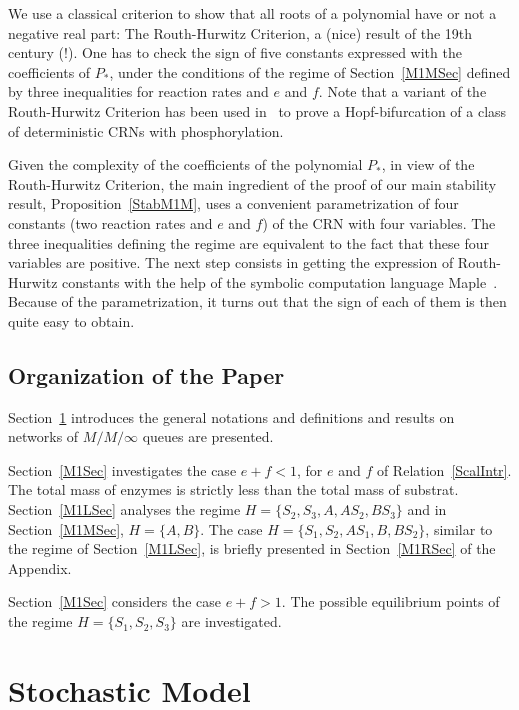\documentclass[english]{amsart}
\numberwithin{proposition}{section}
\begin{document}
\begin{enumerate}
We use a classical criterion to show that all roots of a polynomial have or not a negative real part: The Routh-Hurwitz Criterion, a (nice) result of the 19th century (!). One has to check the sign of five constants expressed with the coefficients of $P_*$, under the conditions of the regime of Section~\ref{M1MSec}  defined by three inequalities for reaction rates and  $e$ and $f$. Note that a variant of the Routh-Hurwitz Criterion has been used in~\citet{Conradi2019} to prove a Hopf-bifurcation of  a class of deterministic CRNs with phosphorylation.

Given the complexity of the coefficients of the polynomial $P_*$, in view of the  Routh-Hurwitz Criterion, the main ingredient of the proof of our main stability result, Proposition~\ref{StabM1M}, uses a convenient parametrization of four constants (two reaction rates and $e$ and $f$) of the CRN with four variables. The three inequalities defining the regime are equivalent to the fact that these four variables are positive. The next step consists in getting the expression of Routh-Hurwitz constants with the help of the symbolic computation language Maple\texttrademark~\cite{Maple}. Because of the parametrization, it turns out that the sign of each of them is then quite easy to obtain.  
\end{enumerate}



\subsection{Organization of the Paper}
Section~\ref{ModelSec} introduces the general notations and definitions and results on networks of $M/M/\infty$ queues are presented. 

Section~\ref{M1Sec}  investigates the case $e{+}f{<}1$, for $e$ and $f$ of Relation~\eqref{ScalIntr}. The total mass of enzymes is strictly less than the total mass of substrat. Section~\ref{M1LSec} analyses the regime $H{=}\{{ S}_2,{ S}_3, { A},  { AS_2}, { BS_3}\}$ and
in Section~\ref{M1MSec},  $H{=}\{{ A}, { B}\}$. The case $H{=}\{{ S}_1, { S}_2,  { AS_1},{ B},  { BS_2}\}$, similar to the regime of Section~\ref{M1LSec}, is briefly presented in Section~\ref{M1RSec} of the Appendix. 

Section~\ref{M1Sec} considers the case $e{+}f{>}1$. The possible equilibrium points of the regime $H{=}\{{ S}_1,{ S}_2,{ S}_3\}$ are investigated.

\section{Stochastic Model}\label{ModelSec}
\end{document}
